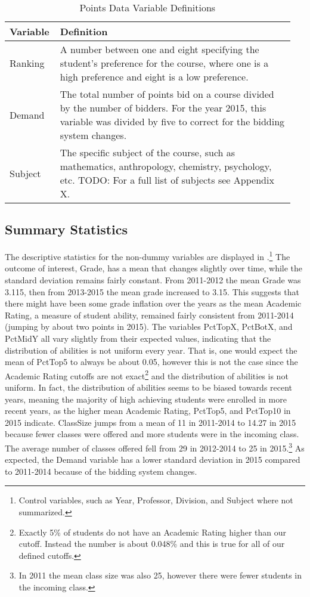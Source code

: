 \begin{table}[htb]
  \centering
  \caption{Points Data Variable Definitions}\label{tab:def2}
  \begin{tabular}{p{0.15\linewidth}|p{0.8\linewidth}} 
    \hline\hline
    Variable & Definition \\ [0.5ex] 
    \hline\hline
    Ranking & A number between one and eight specifying the student's preference for the course, where one is a high preference and eight is a low preference. \\ 
    \hline
    Demand & The total number of points bid on a course divided by the number of bidders. For the year 2015, this variable was divided by five to correct for the bidding system changes.\\
    \hline
    Subject & The specific subject of the course, such as mathematics, anthropology, chemistry, psychology, etc. TODO: For a full list of subjects see Appendix X. \\
    [1ex] 
    \hline\hline
  \end{tabular}
\end{table}

\subsection{Summary Statistics}\label{summarystats}

The descriptive statistics for the non-dummy variables are displayed in .\footnote{Control variables, such as Year, Professor, Division, and Subject where not summarized.} 
The outcome of interest, Grade, has a mean that changes slightly over time, while the standard deviation remains fairly constant. 
From 2011-2012 the mean Grade was 3.115, then from 2013-2015 the mean grade increased to 3.15. 
This suggests that there might have been some grade inflation over the years as the mean Academic Rating, a measure of student ability, remained fairly consistent from 2011-2014 (jumping by about two points in 2015). 
The variables PctTopX, PctBotX, and PctMidY all vary slightly from their expected values, indicating that the distribution of abilities is not uniform every year. 
That is, one would expect the mean of PctTop5 to always be about 0.05, however this is not the case since the Academic Rating cutoffs are not exact\footnote{Exactly 5\% of students do not have an Academic Rating higher than our cutoff. Instead the number is about 0.048\% and this is true for all of our defined cutoffs.} and the distribution of abilities is not uniform. 
In fact, the distribution of abilities seems to be biased towards recent years, meaning the majority of high achieving students were enrolled in more recent years, as the higher mean Academic Rating, PctTop5, and PctTop10 in 2015 indicate. 
ClassSize jumps from a mean of 11 in 2011-2014 to 14.27 in 2015 because fewer classes were offered and more students were in the incoming class.
The average number of classes offered fell from 29 in 2012-2014 to 25 in 2015.\footnote{In 2011 the mean class size was also 25, however there were fewer students in the incoming class.}
As expected, the Demand variable has a lower standard deviation in 2015 compared to 2011-2014 because of the bidding system changes. 


